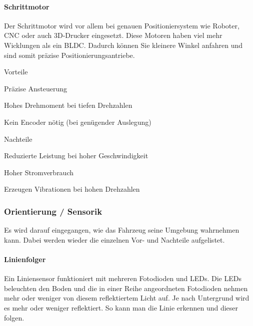 \documentclass[../main.tex]{subfiles}
\begin{document}
\paragraph{Schrittmotor}

Der Schrittmotor wird vor allem bei genauen Positioniersystem wie Roboter, CNC oder auch 3D-Drucker eingesetzt. Diese Motoren haben viel mehr Wicklungen als ein BLDC. Dadurch können Sie kleinere Winkel anfahren und sind somit präzise Positionierungsantriebe. 

\begin{minipage}[t]{0.48\textwidth}
\begin{items}
  \item [Vorteile]
  \item Präzise Ansteuerung
  \item Hohes Drehmoment bei tiefen Drehzahlen
  \item Kein Encoder nötig (bei genügender Auslegung)
\end{items}
\end{minipage}
\hfill
\begin{minipage}[t]{0.48\textwidth}
\begin{items}
  \item [Nachteile]
  \item Reduzierte Leistung bei hoher Geschwindigkeit
  \item Hoher Stromverbrauch
  \item Erzeugen Vibrationen bei hohen Drehzahlen
\end{items}
\end{minipage}

\subsubsection{Orientierung / Sensorik}

Es wird darauf eingegangen, wie das Fahrzeug seine Umgebung wahrnehmen kann. Dabei werden wieder die einzelnen Vor- und Nachteile aufgelistet.

\paragraph{Linienfolger}
Ein Liniensensor funktioniert mit mehreren Fotodioden und LEDs. Die LEDs beleuchten den Boden und die in einer Reihe angeordneten Fotodioden nehmen mehr oder weniger von diesem reflektiertem Licht auf. Je nach Untergrund wird es mehr oder weniger reflektiert. So kann man die Linie erkennen und dieser folgen.
 
\end{document}
